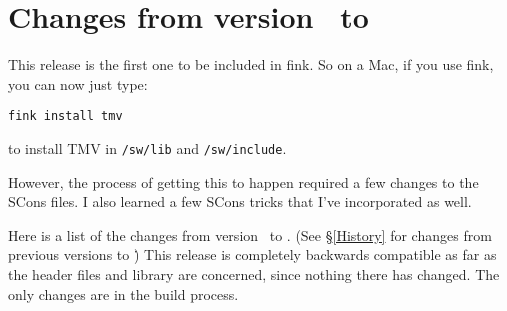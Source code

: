 
\section{Changes from version \prevtmvversion\ to \tmvversion}
\label{Changes}

This release is the first one to be included in fink.  So on a Mac, if you use fink, you can now just type: 

\begin{verbatim}
fink install tmv
\end{verbatim}

to install TMV in \texttt{/sw/lib} and \texttt{/sw/include}.

However, the process of getting this to happen required a few changes to the SCons files.  I also learned a few SCons tricks that I've incorporated as well.

Here is a list of the changes from version \prevtmvversion\ to \tmvversion.  
(See \S\ref{History} for changes from previous versions to \prevtmvversion\.)
This release is completely backwards compatible as far as the header files and library are concerned, since nothing there has changed.  The only changes are in the build process.


